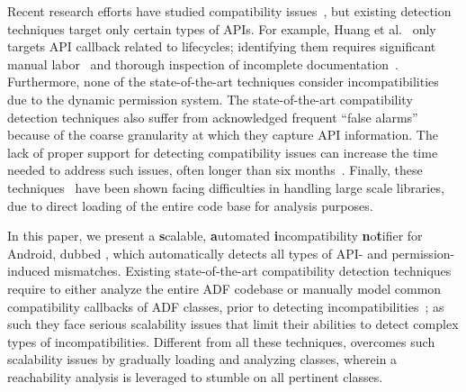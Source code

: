 Recent research efforts have studied compatibility
issues~\cite{huang2018understanding,wei2016taming,wu2017measuring},
but existing detection techniques target only certain
types of APIs.  For example, Huang et
al.~\cite{huang2018understanding} only targets API
callback related to lifecycles; identifying them requires
significant manual labor~\cite{huang2018understanding}
and thorough inspection of incomplete
documentation~\cite{wu2017measuring}.  Furthermore,
none of the state-of-the-art techniques consider
incompatibilities due to the dynamic permission system.
The state-of-the-art compatibility detection techniques
also suffer from acknowledged frequent ``false alarms''
because of the coarse granularity at which they capture
API information.  The lack of proper support for
detecting compatibility issues can increase the time
needed to address such issues, often longer than six 
months~\cite{siliconangle}.
Finally, these techniques~\cite{huang2018understanding,he2018understanding} have been shown facing difficulties in handling large scale libraries, due to direct loading of the entire code base for analysis purposes.




\sloppy In this paper, we present a \textbf{s}calable, \textbf{a}utomated
\textbf{i}ncompatibility \textbf{n}o\textbf{t}ifier for Android, dubbed \@approach, which automatically 
detects all types of API- and permission-induced mismatches.
Existing state-of-the-art compatibility detection techniques
require to either analyze the entire ADF codebase or manually model common compatibility callbacks of ADF classes, prior to detecting incompatibilities~\cite{huang2018understanding,lili2018cid,he2018understanding};
as such they face serious scalability issues that limit their abilities to detect complex types of incompatibilities. 
Different from all these techniques, \@approach overcomes such scalability issues by gradually loading and analyzing classes, wherein a reachability analysis is leveraged to stumble on all pertinent classes.


